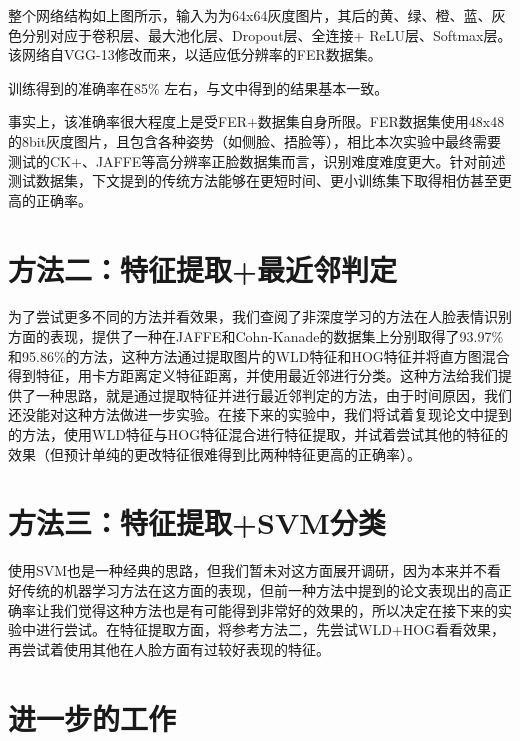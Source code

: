 \documentclass[UTF8]{ctexart}
\begin{document}
整个网络结构如上图所示，输入为为64x64灰度图片，其后的黄、绿、橙、蓝、灰色分别对应于卷积层、最大池化层、Dropout层、全连接+ ReLU层、Softmax层。该网络自VGG-13修改而来，以适应低分辨率的FER数据集。

训练得到的准确率在85\% 左右，与文中得到的结果基本一致。

事实上，该准确率很大程度上是受FER+数据集自身所限。FER数据集使用48x48的8bit灰度图片，且包含各种姿势（如侧脸、捂脸等），相比本次实验中最终需要测试的CK+、JAFFE等高分辨率正脸数据集而言，识别难度难度更大。针对前述测试数据集，下文提到的传统方法能够在更短时间、更小训练集下取得相仿甚至更高的正确率。

\section{方法二：特征提取+最近邻判定}


为了尝试更多不同的方法并看效果，我们查阅了非深度学习的方法在人脸表情识别方面的表现，\cite{wang2013feature}提供了一种在JAFFE和Cohn-Kanade的数据集上分别取得了93.97\%和95.86\%的方法，这种方法通过提取图片的WLD特征和HOG特征并将直方图混合得到特征，用卡方距离定义特征距离，并使用最近邻进行分类。这种方法给我们提供了一种思路，就是通过提取特征并进行最近邻判定的方法，由于时间原因，我们还没能对这种方法做进一步实验。在接下来的实验中，我们将试着复现论文中提到的方法，使用WLD特征与HOG特征混合进行特征提取，并试着尝试其他的特征的效果（但预计单纯的更改特征很难得到比两种特征更高的正确率）。

\section{方法三：特征提取+SVM分类}

使用SVM也是一种经典的思路，但我们暂未对这方面展开调研，因为本来并不看好传统的机器学习方法在这方面的表现，但前一种方法中提到的论文表现出的高正确率让我们觉得这种方法也是有可能得到非常好的效果的，所以决定在接下来的实验中进行尝试。在特征提取方面，将参考方法二，先尝试WLD+HOG看看效果，再尝试着使用其他在人脸方面有过较好表现的特征。

\section{进一步的工作}
\end{document}
